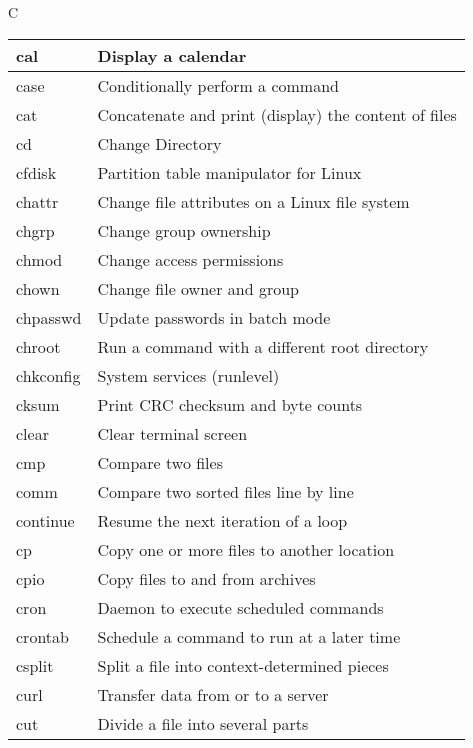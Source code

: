 \begin{flushleft}
\newpage
\begin{tcolorbox}
	\textsc{C}
\end{tcolorbox}

\begin{tabular}{lp{12cm}}
	\hline
 	cal &	Display a calendar \\
 	\hline
	case &	Conditionally perform a command \\
	\hline
	cat &	Concatenate and print (display) the content of files \\
	\hline
	cd &	Change Directory \\
	\hline
	cfdisk	& Partition table manipulator for Linux \\
	\hline
	chattr &	Change file attributes on a Linux file system \\
	\hline
	chgrp &	Change group ownership \\
	\hline
	chmod &	Change access permissions \\
	\hline
	chown &	Change file owner and group \\
	\hline
	chpasswd &	Update passwords in batch mode \\
	\hline
	chroot &	Run a command with a different root directory \\
	\hline
	chkconfig &	System services (runlevel) \\
	\hline
	cksum &	Print CRC checksum and byte counts \\
	\hline
	clear &	Clear terminal screen \\
	\hline
	cmp &	Compare two files \\
	\hline
	comm &	Compare two sorted files line by line \\
	\hline
	continue &	Resume the next iteration of a loop \\
	\hline
	cp &	Copy one or more files to another location \\
	\hline
	cpio &	Copy files to and from archives \\
	\hline
	cron &	Daemon to execute scheduled commands \\
	\hline
	crontab &	Schedule a command to run at a later time \\
	\hline
	csplit &	Split a file into context-determined pieces \\
	\hline
	curl &	Transfer data from or to a server \\
	\hline
	cut &	Divide a file into several parts \\
	\hline
\end{tabular}

\newpage


\end{flushleft}
